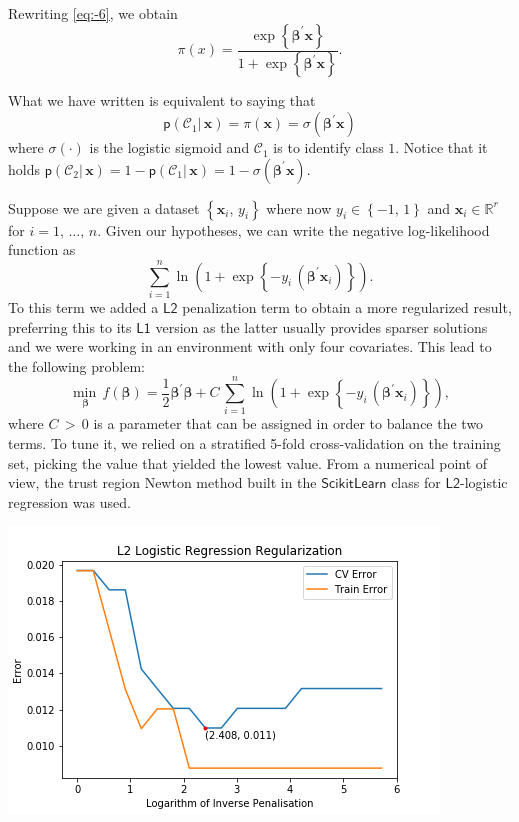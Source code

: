 \documentclass[a4paper]{article}
\begin{document}
Rewriting \ref{eq:-6}, we obtain
\begin{equation}
\pi\left(x\right)=\frac{\exp\left\{ \mathbf{\beta}^{\prime}\mathbf{x}\right\} }{1+\exp\left\{ \mathbf{\beta}^{\prime}\mathbf{x}\right\} }.\label{eq:-5}
\end{equation}

What we have written is equivalent to saying that 
\begin{equation}
\mathsf{p}\left(\mathcal{C}_{1}|\,\mathbf{x}\right)=\pi\left(\mathbf{x}\right)=\sigma\left(\mathbf{\beta}^{\prime}\mathbf{x}\right)\label{eq:-7}
\end{equation}
where $\sigma\left(\cdot\right)$ is the logistic sigmoid and $\mathcal{C}_{1}$
is to identify class $1$. Notice that it holds $\mathsf{p}\left(\mathcal{C}_{2}|\,\mathbf{x}\right)=1-\mathsf{p}\left(\mathcal{C}_{1}|\,\mathbf{x}\right)=1-\sigma\left(\mathbf{\beta}^{\prime}\mathbf{x}\right)$.

Suppose we are given a dataset $\left\{ \mathbf{x}_{i},\,y_{i}\right\} $
where now $y_{i}\in\left\{ -1,\,1\right\} $ and $\mathbf{x}_{i}\in\mathbb{R}^{r}$
for $i=1,\,\ldots,\,n$. Given our hypotheses, we can write the negative
log-likelihood function as
\begin{equation}
\sum_{i=1}^{n}\ln\left(1+\exp\left\{ -y_{i}\,\left(\mathbf{\beta}^{\prime}\mathbf{x}_{i}\right)\right\} \right).\label{eq:-8}
\end{equation}
To this term we added a $\mathsf{L2}$ penalization term to obtain
a more regularized result, preferring this to its $\mathsf{L1}$ version
as the latter usually provides sparser solutions and we were working
in an environment with only four covariates. This lead to the following
problem:
\begin{equation}
\underset{\mathbf{\beta}}{\min\,}f\left(\mathbf{\beta}\right)=\frac{1}{2}\mathbf{\beta}^{\prime}\mathbf{\beta}+C\,\sum_{i=1}^{n}\ln\left(1+\exp\left\{ -y_{i}\,\left(\mathbf{\beta}^{\prime}\mathbf{x}_{i}\right)\right\} \right),\label{eq:-9}
\end{equation}
where $C\,>\,0$ is a parameter that can be assigned in order to balance
the two terms. To tune it, we relied on a stratified 5-fold cross-validation
on the training set, picking the value that yielded the lowest value.
From a numerical point of view, the trust region Newton method built
in the $\mathsf{ScikitLearn}$ class for $\mathsf{L2}$-logistic regression
was used.

\includegraphics{Best C value - L2 Logistic Regression.png}
\end{document}
